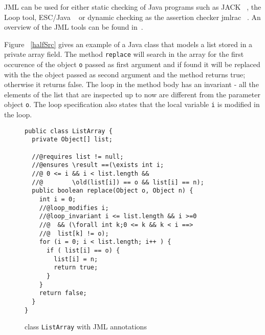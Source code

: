 JML can be used for either static checking of Java programs such as JACK ~\cite{BR02jack}, the Loop tool, 
ESC/Java ~\cite{escjava} or dynamic checking as the assertion checker jmlrac ~\cite{jmlrac}. An overview of the JML tools can 
be found in~\cite{BurdyCCEKLLP03}.
     
Figure ~\ref{halfSrc} gives an example of a Java class that models a list stored in a private array field. 
The method \texttt{replace} will search in the array for the first occurence of the object \texttt{o} passed as first argument and if found it will be replaced with the 
the object passed as second argument and the method returns true; otherwise it returns false. The loop in the method body has an invariant - all
the elements of the list that are inspected up to now are different from the parameter object \texttt{o}. The loop specification also states
that the local variable \texttt{i} is modified in the loop.
\begin{figure}[ht!]
\begin{verbatim}
public class ListArray {
  private Object[] list;

  //@requires list != null;
  //@ensures \result ==(\exists int i; 
  //@ 0 <= i && i < list.length && 
  //@        \old(list[i]) == o && list[i] == n); 
  public boolean replace(Object o, Object n) {
    int i = 0;
    //@loop_modifies i;
    //@loop_invariant i <= list.length && i >=0 
    //@  && (\forall int k;0 <= k && k < i ==> 
    //@  list[k] != o); 
    for (i = 0; i < list.length; i++ ) {
      if ( list[i] == o) {
        list[i] = n;
        return true;	
      }
    }
    return false;
  }
}
\end{verbatim}
\caption{class \texttt{ListArray} with JML annotations} 
\label{replaceSrc}
\end{figure}


